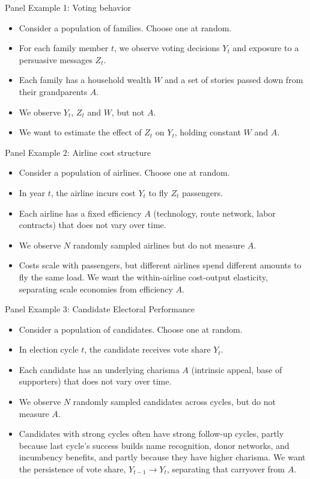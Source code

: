 \documentclass[aspectratio=169, handout]{beamer}
\numberwithin{equation}{section}
\begin{document}
\begin{frame}{Panel Example 1: Voting behavior}
\begin{itemize}
\item Consider a population of families.  Choose one at random.\pause
\item For each family member $t$, we observe voting decisions $Y_t$ and exposure to a persuasive messages $Z_t$.\pause
\item Each family has a household wealth $W$ and a set of stories passed down from their grandparents $A$.\pause
\item We observe $Y_t$, $Z_t$ and $W$, but not $A$. \pause
\item We want to estimate the effect of $Z_t$ on $Y_t$, holding constant $W$ and $A$.
\end{itemize}
\end{frame}

\begin{frame}{Panel Example 2: Airline cost structure}
\begin{itemize}
\item Consider a population of airlines. Choose one at random.\pause
\item In year $t$, the airline incurs cost $Y_t$ to fly $Z_t$ passengers.\pause
\item Each airline has a fixed efficiency $A$ (technology, route network, labor contracts) that does not vary over time.\pause
\item We observe $N$ randomly sampled airlines but do not measure $A$.\pause
\item Costs scale with passengers, but different airlines spend different amounts to fly the same load. We want the within-airline cost-output elasticity, separating scale economies from efficiency $A$.
\end{itemize}
\end{frame}

\begin{frame}{Panel Example 3: Candidate Electoral Performance}
\begin{itemize}
\item Consider a population of candidates. Choose one at random.\pause
\item In election cycle $t$, the candidate receives vote share $Y_t$.\pause
\item Each candidate has an underlying charisma $A$ (intrinsic appeal, base of supporters) that does not vary over time.\pause
\item We observe $N$ randomly sampled candidates across cycles, but do not measure $A$.\pause
\item Candidates with strong cycles often have strong follow-up cycles, partly because last cycle's success builds name recognition, donor networks, and incumbency benefits, and partly because they have higher charisma. We want the persistence of vote share, $Y_{t-1}\to Y_t$, separating that carryover from $A$.
\end{itemize}
\end{frame}
\end{document}
